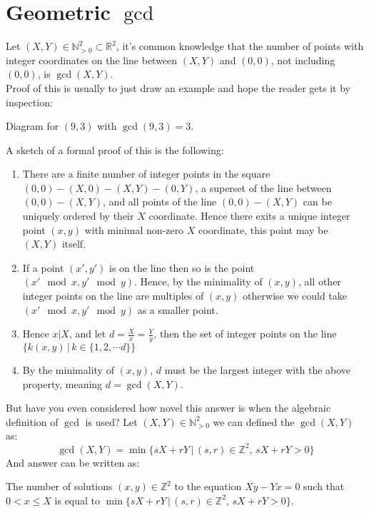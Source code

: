 
\section{Geometric $\gcd$}
Let $(X,Y)\in\mathbb{N}^2_{>0}\subset \mathbb{R}^2$, it's common knowledge that the number of points with integer coordinates on the line between $(X,Y)$ and $(0,0)$, not including $(0,0)$, is $\gcd(X,Y)$.
\\

Proof of this is usually to just draw an example and hope the reader gets it by inspection:
\begin{center}

Diagram for $(9,3)$ with $\gcd(9,3)=3$.
\end{center}

A sketch of a formal proof of this is the following:
\begin{enumerate}
\item There are a finite number of integer points in the square $(0,0)-(X,0)-(X,Y)-(0,Y)$,
a superset of the line between $(0,0)-(X,Y)$,
and all points of the line $(0,0)-(X,Y)$ can be uniquely ordered by their $X$ coordinate.
Hence there exits a unique integer point $(x,y)$ with minimal non-zero $X$ coordinate, this point may be $(X,Y)$ itself.
\item If a point $(x',y')$ is on the line then so is the point $(x'\mod x,y'\mod y)$.
Hence, by the minimality of $(x,y)$, all other integer points on the line are multiples of $(x,y)$ otherwise we could take $(x'\mod x,y'\mod y)$ as a smaller point.
\item Hence $x | X$, and let $d = \frac{X}{x}=\frac{Y}{y}$, then the set of integer points on the line $\{k(x,y)\,|\, k \in \{1,2,\cdots d\}\}$
\item By the minimality of $(x,y)$, $d$ must be the largest integer with the above property, meaning $d=\gcd(X,Y)$.
\end{enumerate}

But have you even considered how novel this answer is when the algebraic definition of $\gcd$ is used?
Let $(X,Y)\in\mathbb{N}^2_{>0}$ we can defined the $\gcd(X,Y)$ as:
\[\gcd(X,Y) = \min\{sX+rY\,|\,(s,r)\in\mathbb{Z}^2,\,sX+rY>0\}\]
And answer can be written as:
\begin{center}
\quad The number of solutions $(x,y)\in \mathbb{Z}^2$ to the equation $Xy-Yx=0$ such that $0<x\leq X$ is equal to $\min\{sX+rY\,|\,(s,r)\in\mathbb{Z}^2,\,sX+rY>0\}$.
\end{center}
